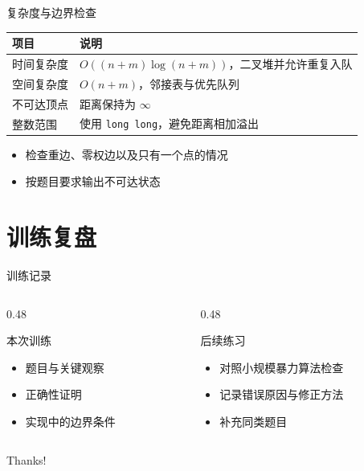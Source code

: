 \documentclass[aspectratio=169]{beamer}
\begin{document}
\begin{frame}{复杂度与边界检查}
  \begin{table}
    \centering
    \begin{tabular}{ll}
      \toprule
      项目 & 说明 \\
      \midrule
      时间复杂度 & \(O((n+m)\log(n+m))\)，二叉堆并允许重复入队 \\
      空间复杂度 & \(O(n+m)\)，邻接表与优先队列 \\
      不可达顶点 & 距离保持为 \(\infty\) \\
      整数范围 & 使用 \texttt{long long}，避免距离相加溢出 \\
      \bottomrule
    \end{tabular}
  \end{table}
  \begin{itemize}
    \item 检查重边、零权边以及只有一个点的情况
    \item 按题目要求输出不可达状态
  \end{itemize}
\end{frame}

\section{训练复盘}

\begin{frame}{训练记录}
  \begin{columns}[t]
    \begin{column}{0.48\textwidth}
      \begin{block}{本次训练}
        \begin{itemize}
          \item 题目与关键观察
          \item 正确性证明
          \item 实现中的边界条件
        \end{itemize}
      \end{block}
    \end{column}
    \begin{column}{0.48\textwidth}
      \begin{exampleblock}{后续练习}
        \begin{itemize}
          \item 对照小规模暴力算法检查
          \item 记录错误原因与修正方法
          \item 补充同类题目
        \end{itemize}
      \end{exampleblock}
    \end{column}
  \end{columns}
\end{frame}

\begin{frame}
  \begin{center}
    {\Huge\calligra Thanks!}
  \end{center}
\end{frame}
\end{document}
